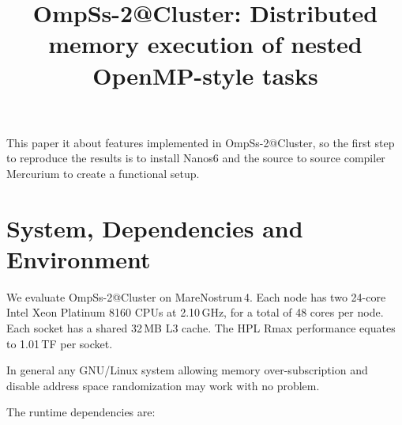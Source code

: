 \documentclass{article}
\begin{document}
\title{OmpSs-2@Cluster: Distributed memory execution of nested OpenMP-style tasks}


\maketitle

This paper it about features implemented in OmpSs-2@Cluster, so the
first step to reproduce the results is to install Nanos6 and the
source to source compiler Mercurium to create a functional setup.

\section{System, Dependencies and Environment}

We evaluate OmpSs-2@Cluster on MareNostrum\,4. Each node has two
24-core Intel Xeon Platinum 8160 CPUs at 2.10\,GHz, for a total of 48
cores per node.  Each socket has a shared 32\,MB L3 cache.  The HPL
Rmax performance equates to 1.01\,TF per socket.

In general any GNU/Linux system allowing memory over-subscription and
disable address space randomization may work with no problem.


The runtime dependencies are:
\end{document}
